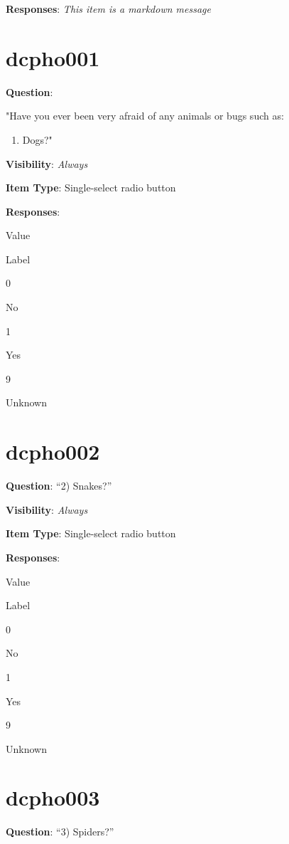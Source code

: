 \documentclass[]{book}
\providecommand{\tightlist}{%
  \setlength{\itemsep}{0pt}\setlength{\parskip}{0pt}}
\begin{document}
\textbf{Responses}: \emph{This item is a markdown message}

\hypertarget{dcpho001}{%
\section{dcpho001}\label{dcpho001}}

\textbf{Question}:

"Have you ever been very afraid of any animals or bugs such as:

\begin{enumerate}
\def\labelenumi{\arabic{enumi})}
\tightlist
\item
  Dogs?"
\end{enumerate}

\textbf{Visibility}: \emph{Always}

\textbf{Item Type}: Single-select radio button

\textbf{Responses}:

Value

Label

0

No

1

Yes

9

Unknown

\hypertarget{dcpho002}{%
\section{dcpho002}\label{dcpho002}}

\textbf{Question}: ``2) Snakes?''

\textbf{Visibility}: \emph{Always}

\textbf{Item Type}: Single-select radio button

\textbf{Responses}:

Value

Label

0

No

1

Yes

9

Unknown

\hypertarget{dcpho003}{%
\section{dcpho003}\label{dcpho003}}

\textbf{Question}: ``3) Spiders?''
\end{document}
